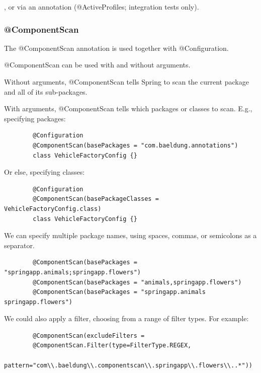 \documentclass{scrartcl}
\begin{document}
   , or via an annotation (@ActiveProfiles; integration tests only).


\subsubsection{@ComponentScan}

    The @ComponentScan annotation is used together with @Configuration.

    @ComponentScan can be used with and without arguments.

    Without arguments, @ComponentScan  tells Spring to scan the current package and all of its sub-packages.

    With arguments, @ComponentScan tells which packages or classes to scan. E.g., specifying packages:

    \begin{lstlisting}
        @Configuration
        @ComponentScan(basePackages = "com.baeldung.annotations")
        class VehicleFactoryConfig {}
    \end{lstlisting}

    Or else, specifying classes:

    \begin{lstlisting}
        @Configuration
        @ComponentScan(basePackageClasses = VehicleFactoryConfig.class)
        class VehicleFactoryConfig {}
    \end{lstlisting}

    We can specify multiple package names, using spaces, commas, or semicolons as a separator.

    \begin{lstlisting}
        @ComponentScan(basePackages = "springapp.animals;springapp.flowers")
        @ComponentScan(basePackages = "animals,springapp.flowers")
        @ComponentScan(basePackages = "springapp.animals springapp.flowers")
    \end{lstlisting}

    We could also apply a filter, choosing from a range of filter types. For example:

    \begin{lstlisting}
        @ComponentScan(excludeFilters =
        @ComponentScan.Filter(type=FilterType.REGEX,
        pattern="com\\.baeldung\\.componentscan\\.springapp\\.flowers\\..*"))
    \end{lstlisting}
\end{document}
